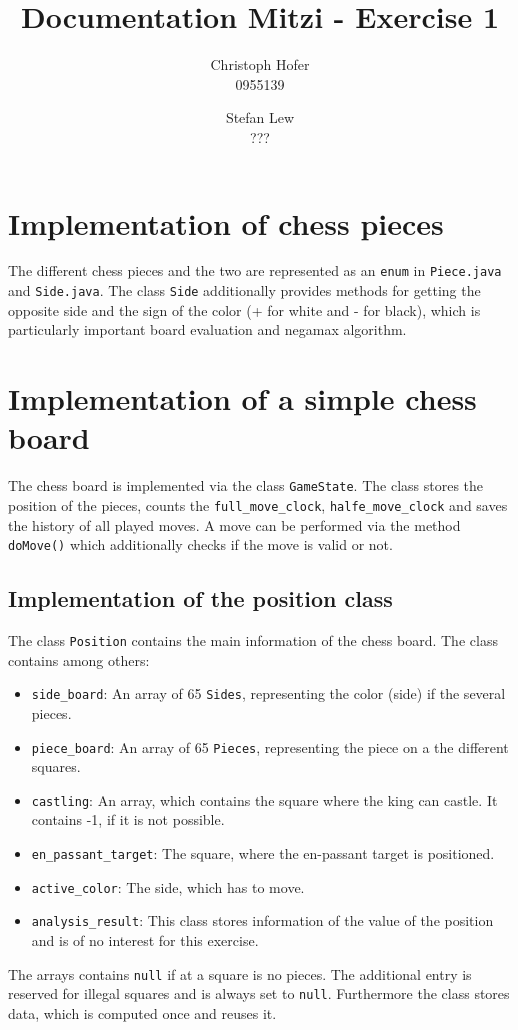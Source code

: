 \documentclass [12pt ,a4paper, naustrian]{scrartcl}
\author{Christoph Hofer\\ 0955139 \and Stefan Lew \\ ???}
\title{Documentation Mitzi - Exercise 1}
\theoremstyle{plain}
\theoremstyle{definition}
\theoremstyle{remark}
\begin{document}
\maketitle
\newpage

\section{Implementation of chess pieces}
	The different chess pieces and the two are represented as an \verb+enum+ in \verb+Piece.java+ and \verb+Side.java+. The class \verb+Side+ additionally provides methods for getting the opposite side and the sign of the color (+ for white and - for black), which is particularly important board evaluation and negamax algorithm.
	
\section{Implementation of a simple chess board}
	The chess board is implemented via the class \verb+GameState+. The class stores the position of the pieces, counts the \verb+full_move_clock+, \verb+halfe_move_clock+ and saves the history of all played moves. A move can be performed via the method \verb+doMove()+ which additionally checks if the move is valid or not.	
	
	\subsection{Implementation of the position class}
		The class \verb+Position+ contains the main information of the chess board. The class contains among others:
		\begin{itemize}
			\item \verb+side_board+: An array of 65 \verb+Sides+, representing the color (side) if the several pieces.
			\item \verb+piece_board+: An array of 65 \verb+Pieces+, representing the piece on a the different squares.
			\item \verb+castling+: An array, which contains the square where the king can castle. It contains -1, if it is not possible.
			\item \verb+en_passant_target+: The square, where the en-passant target is positioned.
			\item \verb+active_color+: The side, which has to move.
			\item \verb+analysis_result+: This class stores information of the value of the position and is of no interest for this exercise.
		\end{itemize}
		The arrays contains \verb+null+ if at a square is no pieces. The additional entry    is reserved for illegal squares and is always set to \verb+null+. Furthermore the class stores data, which is computed once and reuses it.
		
\end{document}
